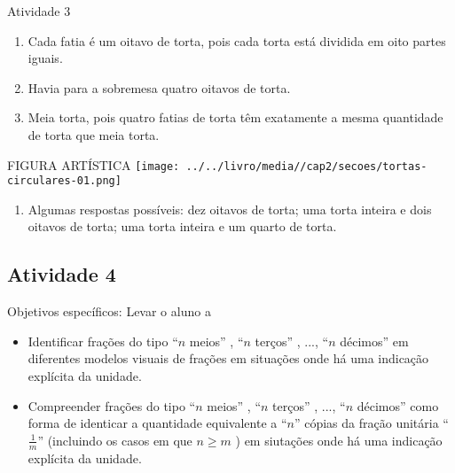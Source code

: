 \documentclass[oneside]{book}
\begin{document}
\begin{multicols}{2}
\begin{resposta*}{Atividade 3}
\begin{enumerate} [\quad a)] %
    \item       Cada fatia é um oitavo de torta, pois cada torta está dividida em oito partes iguais.
    \item       Havia para a sobremesa quatro oitavos de torta.
    \item       Meia torta, pois quatro fatias de torta têm exatamente a mesma quantidade de torta que meia torta.      \mbox{} \newline
\end{enumerate} %
  \begin{imagem*}[breakable]{}{}     FIGURA ARTÍSTICA         \texttt{[image: ../../livro/media//cap2/secoes/tortas-circulares-01.png]}  \end{imagem*}
\begin{enumerate} [\quad a)] %
    \item       Algumas respostas possíveis: dez oitavos de torta;  uma torta inteira e dois oitavos de torta; uma torta inteira e um quarto de torta.
\end{enumerate} %

\end{resposta*}



\subsection{Atividade 4}





  Objetivos específicos: Levar o aluno a
\begin{itemize} %
    \item       Identificar frações do tipo       ``$n$ meios''      ,       ``$n$ terços''      , ...,       ``$n$ décimos''       em diferentes modelos visuais de frações em situações onde há uma indicação explícita da unidade.
    \item       Compreender frações do tipo       ``$n$ meios''      ,       ``$n$ terços''      , ...,       ``$n$ décimos''       como forma de identicar a quantidade equivalente a       ``$n$''       cópias da fração unitária       ``$\frac{1}{m}$''       (incluindo os casos em que       $n \geq m$      ) em siutações onde há uma indicação explícita da unidade.
\end{itemize} %



\end{multicols}
\end{document}
